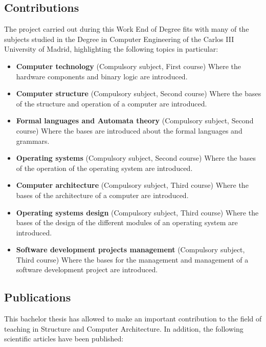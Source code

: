 \subsection{Contributions}

The project carried out during this Work End of Degree fits with many of the subjects studied in the Degree in Computer Engineering of the Carlos III University of Madrid, highlighting the following topics in particular:

\begin{itemize}

\item \textbf{Computer technology} (Compulsory subject, First course) Where the hardware components and binary logic are introduced.

\item \textbf{Computer structure} (Compulsory subject, Second course) Where the bases of the structure and operation of a computer are introduced.

\item \textbf{Formal languages and Automata theory} (Compulsory subject, Second course) Where the bases are introduced about the formal languages and grammars.

\item \textbf{Operating systems} (Compulsory subject, Second course) Where the bases of the operation of the operating system are introduced.

\item \textbf{Computer architecture} (Compulsory subject, Third course) Where the bases of the architecture of a computer are introduced.

\item \textbf{Operating systems design} (Compulsory subject, Third course) Where the bases of the design of the different modules of an operating system are introduced.

\item \textbf{Software development projects management} (Compulsory subject, Third course) Where the bases for the management and management of a software development project are introduced.

\end{itemize}

\subsection{Publications}

This bachelor thesis has allowed to make an important contribution to the field of teaching in Structure and Computer Architecture. In addition, the following scientific articles have been published:

